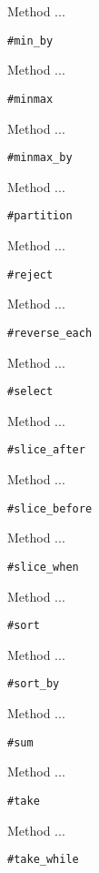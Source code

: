 Method ...
\begin{verbatim}
#min_by
\end{verbatim}

Method ...
\begin{verbatim}
#minmax
\end{verbatim}

Method ...
\begin{verbatim}
#minmax_by
\end{verbatim}

Method ...
\begin{verbatim}
#partition
\end{verbatim}


Method ...
\begin{verbatim}
#reject
\end{verbatim}

Method ...
\begin{verbatim}
#reverse_each
\end{verbatim}

Method ...
\begin{verbatim}
#select
\end{verbatim}

Method ...
\begin{verbatim}
#slice_after
\end{verbatim}

Method ...
\begin{verbatim}
#slice_before
\end{verbatim}

Method ...
\begin{verbatim}
#slice_when
\end{verbatim}

Method ...
\begin{verbatim}
#sort
\end{verbatim}

Method ...
\begin{verbatim}
#sort_by
\end{verbatim}

Method ...
\begin{verbatim}
#sum
\end{verbatim}

Method ...
\begin{verbatim}
#take
\end{verbatim}

Method ...
\begin{verbatim}
#take_while
\end{verbatim}

